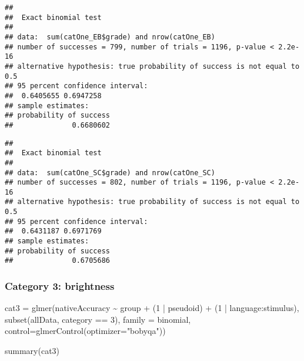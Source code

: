 \documentclass[
]{article}
\newenvironment{Shaded}{\begin{snugshade}}{\end{snugshade}}
\newcommand{\AttributeTok}[1]{\textcolor[rgb]{0.77,0.63,0.00}{#1}}
\newcommand{\DecValTok}[1]{\textcolor[rgb]{0.00,0.00,0.81}{#1}}
\newcommand{\FunctionTok}[1]{\textcolor[rgb]{0.00,0.00,0.00}{#1}}
\newcommand{\NormalTok}[1]{#1}
\newcommand{\OtherTok}[1]{\textcolor[rgb]{0.56,0.35,0.01}{#1}}
\newcommand{\SpecialCharTok}[1]{\textcolor[rgb]{0.00,0.00,0.00}{#1}}
\newcommand{\StringTok}[1]{\textcolor[rgb]{0.31,0.60,0.02}{#1}}
\begin{document}
\begin{verbatim}
## 
##  Exact binomial test
## 
## data:  sum(catOne_EB$grade) and nrow(catOne_EB)
## number of successes = 799, number of trials = 1196, p-value < 2.2e-16
## alternative hypothesis: true probability of success is not equal to 0.5
## 95 percent confidence interval:
##  0.6405655 0.6947258
## sample estimates:
## probability of success 
##              0.6680602
\end{verbatim}

\begin{Shaded}
\end{Shaded}

\begin{verbatim}
## 
##  Exact binomial test
## 
## data:  sum(catOne_SC$grade) and nrow(catOne_SC)
## number of successes = 802, number of trials = 1196, p-value < 2.2e-16
## alternative hypothesis: true probability of success is not equal to 0.5
## 95 percent confidence interval:
##  0.6431187 0.6971769
## sample estimates:
## probability of success 
##              0.6705686
\end{verbatim}

\hypertarget{category-3-brightness}{%
\subsubsection{Category 3: brightness}\label{category-3-brightness}}

\begin{Shaded}
\begin{Highlighting}[]
\NormalTok{cat3 }\OtherTok{=} \FunctionTok{glmer}\NormalTok{(nativeAccuracy }\SpecialCharTok{\textasciitilde{}}\NormalTok{ group }\SpecialCharTok{+}
\NormalTok{        (}\DecValTok{1} \SpecialCharTok{|}\NormalTok{ pseudoid) }\SpecialCharTok{+}\NormalTok{ (}\DecValTok{1} \SpecialCharTok{|}\NormalTok{ language}\SpecialCharTok{:}\NormalTok{stimulus),}
      \FunctionTok{subset}\NormalTok{(allData, category }\SpecialCharTok{==} \DecValTok{3}\NormalTok{),}
      \AttributeTok{family =}\NormalTok{ binomial,}
      \AttributeTok{control=}\FunctionTok{glmerControl}\NormalTok{(}\AttributeTok{optimizer=}\StringTok{"bobyqa"}\NormalTok{))}

\FunctionTok{summary}\NormalTok{(cat3)}
\end{Highlighting}
\end{Shaded}
\end{document}
